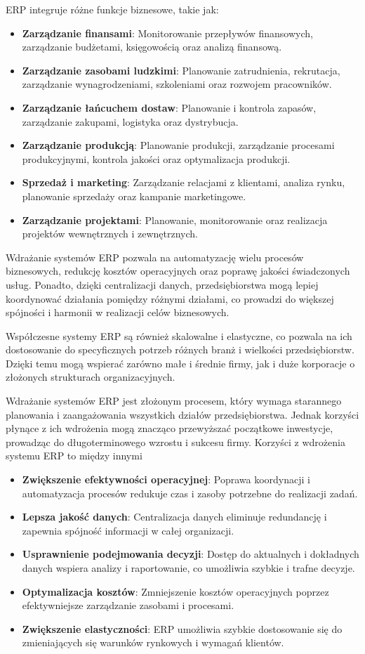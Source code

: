 ERP integruje różne funkcje biznesowe, takie jak:
\begin{itemize}
    \item \textbf{Zarządzanie finansami}: Monitorowanie przepływów finansowych, zarządzanie budżetami, księgowością oraz analizą finansową.
    \item \textbf{Zarządzanie zasobami ludzkimi}: Planowanie zatrudnienia, rekrutacja, zarządzanie wynagrodzeniami, szkoleniami oraz rozwojem pracowników.
    \item \textbf{Zarządzanie łańcuchem dostaw}: Planowanie i kontrola zapasów, zarządzanie zakupami, logistyka oraz dystrybucja.
    \item \textbf{Zarządzanie produkcją}: Planowanie produkcji, zarządzanie procesami produkcyjnymi, kontrola jakości oraz optymalizacja produkcji.
    \item \textbf{Sprzedaż i marketing}: Zarządzanie relacjami z klientami, analiza rynku, planowanie sprzedaży oraz kampanie marketingowe.
    \item \textbf{Zarządzanie projektami}: Planowanie, monitorowanie oraz realizacja projektów wewnętrznych i zewnętrznych.
\end{itemize}

Wdrażanie systemów ERP pozwala na automatyzację wielu procesów biznesowych, redukcję kosztów operacyjnych oraz poprawę jakości świadczonych usług. Ponadto, dzięki centralizacji danych, przedsiębiorstwa mogą lepiej koordynować działania pomiędzy różnymi działami, co prowadzi do większej spójności i harmonii w realizacji celów biznesowych.

Współczesne systemy ERP są również skalowalne i elastyczne, co pozwala na ich dostosowanie do specyficznych potrzeb różnych branż i wielkości przedsiębiorstw. Dzięki temu mogą wspierać zarówno małe i średnie firmy, jak i duże korporacje o złożonych strukturach organizacyjnych.

Wdrażanie systemów ERP jest złożonym procesem,
który wymaga starannego planowania i zaangażowania
wszystkich działów przedsiębiorstwa.
Jednak korzyści płynące z ich wdrożenia mogą
znacząco przewyższać początkowe inwestycje,
prowadząc do długoterminowego wzrostu i sukcesu
firmy. Korzyści z wdrożenia systemu ERP to między innymi
\begin{itemize}
    \item \textbf{Zwiększenie efektywności operacyjnej}: Poprawa koordynacji i automatyzacja procesów redukuje czas i zasoby potrzebne do realizacji zadań.
    \item \textbf{Lepsza jakość danych}: Centralizacja danych eliminuje redundancję i zapewnia spójność informacji w całej organizacji.
    \item \textbf{Usprawnienie podejmowania decyzji}: Dostęp do aktualnych i dokładnych danych wspiera analizy i raportowanie, co umożliwia szybkie i trafne decyzje.
    \item \textbf{Optymalizacja kosztów}: Zmniejszenie kosztów operacyjnych poprzez efektywniejsze zarządzanie zasobami i procesami.
    \item \textbf{Zwiększenie elastyczności}: ERP umożliwia szybkie dostosowanie się do zmieniających się warunków rynkowych i wymagań klientów.
\end{itemize}

